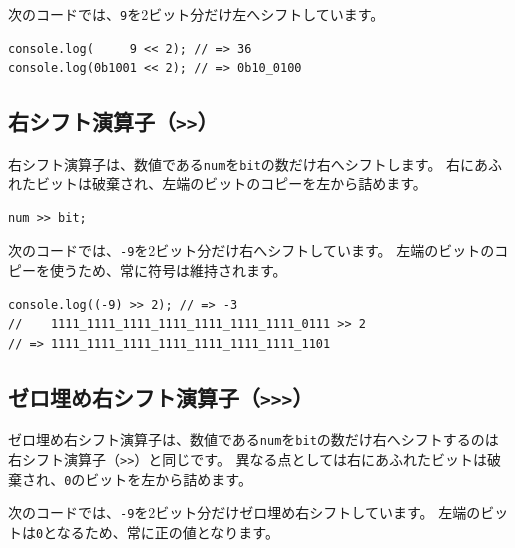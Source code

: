 次のコードでは、\texttt{9}を2ビット分だけ左へシフトしています。

\begin{lstlisting}
console.log(     9 << 2); // => 36
console.log(0b1001 << 2); // => 0b10_0100
\end{lstlisting}

\hypertarget{right-shift}{%
\subsection{\texorpdfstring{右シフト演算子（\texttt{\textgreater{}\textgreater{}}）}{右シフト演算子（\textgreater{}\textgreater{}）}}\label{right-shift}}

右シフト演算子は、数値である\texttt{num}を\texttt{bit}の数だけ右へシフトします。
右にあふれたビットは破棄され、左端のビットのコピーを左から詰めます。

\begin{lstlisting}
num >> bit;
\end{lstlisting}

次のコードでは、\texttt{-9}を2ビット分だけ右へシフトしています。
左端のビットのコピーを使うため、常に符号は維持されます。

\begin{lstlisting}
console.log((-9) >> 2); // => -3
//    1111_1111_1111_1111_1111_1111_1111_0111 >> 2
// => 1111_1111_1111_1111_1111_1111_1111_1101
\end{lstlisting}

\hypertarget{fill-zero-right-shift}{%
\subsection{\texorpdfstring{ゼロ埋め右シフト演算子（\texttt{\textgreater{}\textgreater{}\textgreater{}}）}{ゼロ埋め右シフト演算子（\textgreater{}\textgreater{}\textgreater{}）}}\label{fill-zero-right-shift}}

ゼロ埋め右シフト演算子は、数値である\texttt{num}を\texttt{bit}の数だけ右へシフトするのは右シフト演算子（\lstinline{>>}）と同じです。
異なる点としては右にあふれたビットは破棄され、\texttt{0}のビットを左から詰めます。

次のコードでは、\texttt{-9}を2ビット分だけゼロ埋め右シフトしています。
左端のビットは\texttt{0}となるため、常に正の値となります。

